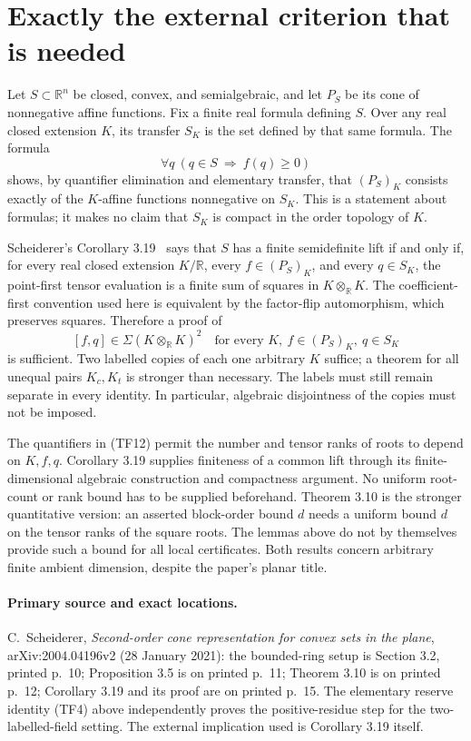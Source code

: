 \section{Exactly the external criterion that is needed}
Let $S\subset\mathbb R^n$ be closed, convex, and semialgebraic, and
let $P_S$ be its cone of nonnegative affine functions. Fix a finite
real formula defining $S$. Over any real closed extension $K$, its
transfer $S_K$ is the set defined by that same formula. The formula
\[
          \forall q\ (q\in S\ \Longrightarrow\ f(q)\ge0)
 \tag{TF11}
\]
shows, by quantifier elimination and elementary transfer, that
$(P_S)_K$ consists exactly of the $K$-affine functions nonnegative
on $S_K$. This is a statement about formulas; it makes no claim
that $S_K$ is compact in the order topology of $K$.

Scheiderer's Corollary 3.19~\cite{scheiderer} says that $S$ has a finite semidefinite
lift if and only if, for every real closed extension $K/\mathbb R$,
every $f\in(P_S)_K$, and every $q\in S_K$, the point-first tensor
evaluation is a finite sum of squares in $K\otimes_{\mathbb R}K$.
The coefficient-first convention used here is equivalent by the
factor-flip automorphism, which preserves squares.
Therefore a proof of
\[
       [f,q]\in\Sigma(K\otimes_{\mathbb R}K)^2
       \quad\text{for every }K,\ f\in(P_S)_K,\ q\in S_K
 \tag{TF12}
\]
is sufficient. Two labelled copies of each one arbitrary $K$ suffice;
a theorem for all unequal pairs $K_c,K_t$ is stronger than necessary.
The labels must still remain separate in every identity. In particular,
algebraic disjointness of the copies must not be imposed.

The quantifiers in (TF12) permit the number and tensor ranks of roots
to depend on $K,f,q$. Corollary 3.19 supplies finiteness of a common
lift through its finite-dimensional algebraic construction and
compactness argument. No uniform root-count or rank bound has to be
supplied beforehand. Theorem 3.10 is the stronger quantitative version:
an asserted block-order bound $d$ needs a uniform bound $d$ on the
tensor ranks of the square roots. The lemmas above do not by themselves
provide such a bound for all local certificates. Both results concern
arbitrary finite ambient dimension, despite the paper's planar title.

\paragraph{Primary source and exact locations.}
C.~Scheiderer, \emph{Second-order cone representation for convex sets
in the plane}, arXiv:2004.04196v2 (28 January 2021): the bounded-ring
setup is Section 3.2, printed p.~10; Proposition 3.5 is on printed
p.~11; Theorem 3.10 is on printed p.~12; Corollary 3.19 and its proof
are on printed p.~15. The elementary reserve identity (TF4) above
independently proves the positive-residue step for the two-labelled-field
setting. The external implication used is Corollary 3.19 itself.

